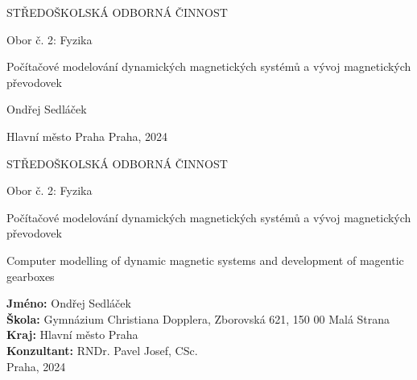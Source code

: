 \documentclass[12pt, a4paper,
 twoside,        %
 openright
]{report}
\title{\mainTitle} %
\author{\authorName} %
\date{\publicationYear} %
\newcommand\city{Praha} %
\newcommand\district{Hlavní město Praha} %
\newcommand\specialization{Obor č. 2: Fyzika} %
\newcommand\school{Gymnázium Christiana Dopplera} %
\newcommand\schoolAddress{Zborovská 621, 150 00 Malá Strana} %
\newcommand\consultant{RNDr. Pavel Josef, CSc.} %
\newcommand\authorName{Ondřej Sedláček}  %
\newcommand\publicationYear{2024} %
\newcommand\mainTitle{Počítačové modelování dynamických magnetických systémů a vývoj magnetických převodovek} %
\newcommand\mainTitleEN{Computer modelling of dynamic magnetic systems and development of magentic gearboxes} %
\begin{document}
\pagestyle{empty}
\graphicspath{{./imgsHR}}

\begin{titlepage}
    \bfseries{ %
        \begin{center}
            \LARGE{STŘEDOŠKOLSKÁ ODBORNÁ ČINNOST}

            \vspace{14pt}
            \large{ %
                \specialization
            } %

            \vspace{0.3 \textheight}

            \LARGE{ %
                \mainTitle
            }%

            \vspace{0.35 \textheight}
        \end{center}

        \noindent\Large{\authorName}

        \noindent\Large{\district {}  \city, \publicationYear}


    } %
\end{titlepage}
\cleardoublepage

{\bfseries %
    \begin{center}
        \LARGE{STŘEDOŠKOLSKÁ ODBORNÁ ČINNOST}

        \vspace{14pt}
        {\large %
            \specialization %
        } %

        \vspace{0.20 \textheight}

        \LARGE{ %
            \mainTitle
        }

        \LARGE{ %
            \mainTitleEN
        }%

        \vspace{0.20\textheight}
    \end{center}
}%
{\Large %
    \noindent\textbf{Jméno:} \authorName\\
    \textbf{Škola:} \school, \schoolAddress\\
    \textbf{Kraj:} \district\\
    \textbf{Konzultant:} \consultant\\
} %
\noindent \city, \publicationYear
\cleardoublepage
\end{document}
